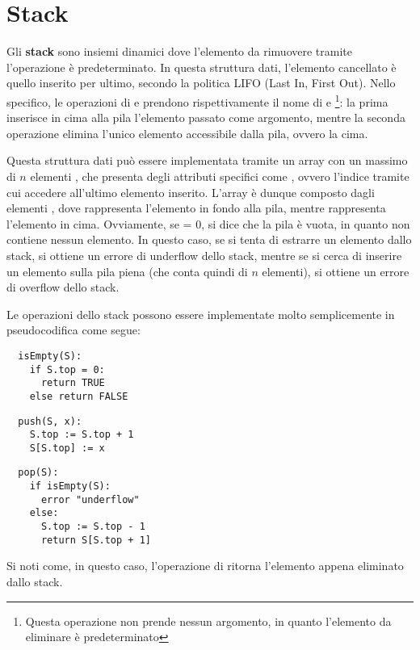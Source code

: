 \section{Stack}
Gli \textbf{stack} sono insiemi dinamici dove l'elemento da rimuovere tramite l'operazione  è predeterminato. In questa struttura dati, l'elemento cancellato è quello inserito per ultimo, secondo la politica LIFO (Last In, First Out). Nello specifico, le operazioni di  e  prendono rispettivamente il nome di  e  \footnote{Questa operazione non prende nessun argomento, in quanto l'elemento da eliminare è predeterminato}: la prima inserisce in cima alla pila l'elemento passato come argomento, mentre la seconda operazione elimina l'unico elemento accessibile dalla pila, ovvero la cima. 

Questa struttura dati può essere implementata tramite un array con un massimo di \(n\) elementi , che presenta degli attributi specifici come , ovvero l'indice tramite cui accedere all'ultimo elemento inserito. L'array è dunque composto dagli elementi , dove  rappresenta l'elemento in fondo alla pila, mentre  rappresenta l'elemento in cima. Ovviamente, se  = 0, si dice che la pila è vuota, in quanto non contiene nessun elemento. In questo caso, se si tenta di estrarre un elemento dallo stack, si ottiene un errore di underflow dello stack, mentre se si cerca di inserire un elemento sulla pila piena (che conta quindi di \(n\) elementi), si ottiene un errore di overflow dello stack.

Le operazioni dello stack possono essere implementate molto semplicemente in pseudocodifica come segue:

\begin{lstlisting}
  isEmpty(S):
    if S.top = 0:
      return TRUE
    else return FALSE
\end{lstlisting} 

\begin{lstlisting}
  push(S, x):
    S.top := S.top + 1
    S[S.top] := x
\end{lstlisting}

\begin{lstlisting}
  pop(S):
    if isEmpty(S):
      error "underflow"
    else:
      S.top := S.top - 1
      return S[S.top + 1]
\end{lstlisting}

Si noti come, in questo caso, l'operazione di  ritorna l'elemento appena eliminato dallo stack.

